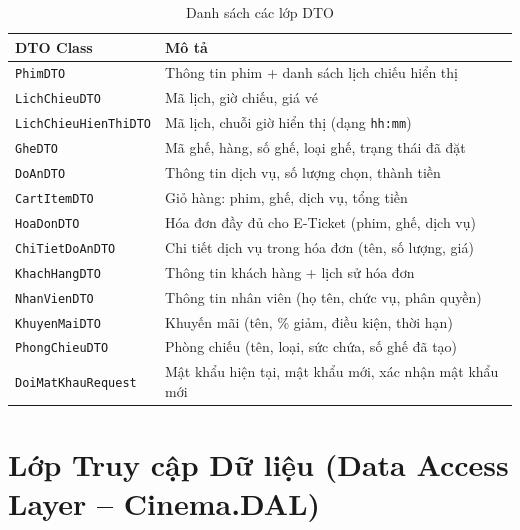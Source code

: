 \documentclass[12pt,a4paper,oneside]{book}
\theoremstyle{plain}
\numberwithin{equation}{chapter}
\begin{document}
\begin{table}[H]
    \begin{center}
        \begin{tabular}{|l|l|}
            \hline
            \textbf{DTO Class} & \textbf{Mô tả} \\
            \hline
            \texttt{PhimDTO}              & Thông tin phim + danh sách lịch chiếu hiển thị \\
            \hline
            \texttt{LichChieuDTO}         & Mã lịch, giờ chiếu, giá vé \\
            \hline
            \texttt{LichChieuHienThiDTO}  & Mã lịch, chuỗi giờ hiển thị (dạng \texttt{hh:mm}) \\
            \hline
            \texttt{GheDTO}               & Mã ghế, hàng, số ghế, loại ghế, trạng thái đã đặt \\
            \hline
            \texttt{DoAnDTO}              & Thông tin dịch vụ, số lượng chọn, thành tiền \\
            \hline
            \texttt{CartItemDTO}          & Giỏ hàng: phim, ghế, dịch vụ, tổng tiền \\
            \hline
            \texttt{HoaDonDTO}            & Hóa đơn đầy đủ cho E-Ticket (phim, ghế, dịch vụ) \\
            \hline
            \texttt{ChiTietDoAnDTO}       & Chi tiết dịch vụ trong hóa đơn (tên, số lượng, giá) \\
            \hline
            \texttt{KhachHangDTO}         & Thông tin khách hàng + lịch sử hóa đơn \\
            \hline
            \texttt{NhanVienDTO}          & Thông tin nhân viên (họ tên, chức vụ, phân quyền) \\
            \hline
            \texttt{KhuyenMaiDTO}         & Khuyến mãi (tên, \% giảm, điều kiện, thời hạn) \\
            \hline
            \texttt{PhongChieuDTO}        & Phòng chiếu (tên, loại, sức chứa, số ghế đã tạo) \\
            \hline
            \texttt{DoiMatKhauRequest}    & Mật khẩu hiện tại, mật khẩu mới, xác nhận mật khẩu mới \\
            \hline
        \end{tabular}
    \end{center}
    \caption{Danh sách các lớp DTO}\label{table_dto}
\end{table}

\section{Lớp Truy cập Dữ liệu (Data Access Layer -- Cinema.DAL)}\label{Sec3.4}
\end{document}
